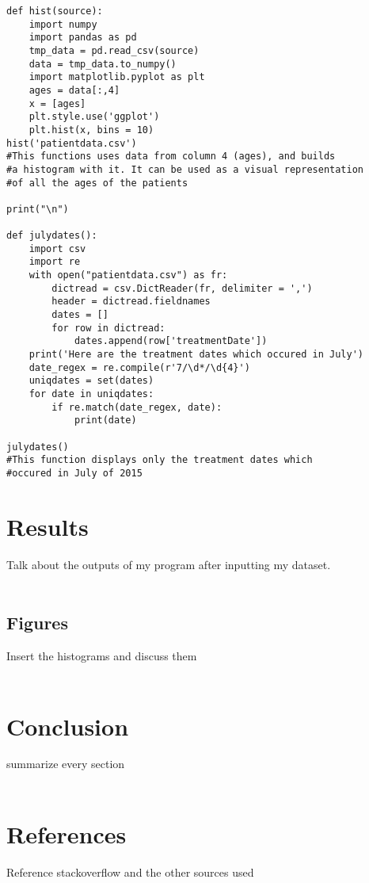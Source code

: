 \documentclass{article}
\begin{document}
\begin{verbatim}
def hist(source):
    import numpy
    import pandas as pd
    tmp_data = pd.read_csv(source)
    data = tmp_data.to_numpy()
    import matplotlib.pyplot as plt
    ages = data[:,4]
    x = [ages]
    plt.style.use('ggplot')
    plt.hist(x, bins = 10)
hist('patientdata.csv')
#This functions uses data from column 4 (ages), and builds
#a histogram with it. It can be used as a visual representation
#of all the ages of the patients

print("\n")

def julydates():
    import csv
    import re
    with open("patientdata.csv") as fr:
        dictread = csv.DictReader(fr, delimiter = ',')
        header = dictread.fieldnames
        dates = []
        for row in dictread:
            dates.append(row['treatmentDate'])
    print('Here are the treatment dates which occured in July')
    date_regex = re.compile(r'7/\d*/\d{4}')
    uniqdates = set(dates)
    for date in uniqdates:
        if re.match(date_regex, date):
            print(date)

julydates()
#This function displays only the treatment dates which
#occured in July of 2015

\end{verbatim}


\section{Results}
Talk about the outputs of my program after inputting my dataset. \\\\

\subsection{Figures}
Insert the histograms and discuss them\\\\

\section{Conclusion}
summarize every section\\\\

\section{References}
Reference stackoverflow and the other sources used\\\\
\end{document}
